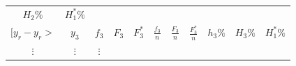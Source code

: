 \documentclass[10pt,]{krantz}
\theoremstyle{definition}
\theoremstyle{definition}
\theoremstyle{definition}
\theoremstyle{definition}
\theoremstyle{remark}
\begin{document}
\begin{longtable}[]{@{}ccccccccccc@{}}
\begin{minipage}[t]{0.05\columnwidth}
\(H_2\%\)\strut
\end{minipage} & \begin{minipage}[t]{0.05\columnwidth}\centering
\(H_1^*\%\)\strut
\end{minipage}\tabularnewline
\begin{minipage}[t]{0.16\columnwidth}\centering
\([y_{r}-y_r>\)\strut
\end{minipage} & \begin{minipage}[t]{0.08\columnwidth}\centering
\(y_3\)\strut
\end{minipage} & \begin{minipage}[t]{0.05\columnwidth}\centering
\(f_3\)\strut
\end{minipage} & \begin{minipage}[t]{0.05\columnwidth}\centering
\(F_3\)\strut
\end{minipage} & \begin{minipage}[t]{0.05\columnwidth}\centering
\(F_3^*\)\strut
\end{minipage} & \begin{minipage}[t]{0.05\columnwidth}\centering
\(\frac{f_3}{n}\)\strut
\end{minipage} & \begin{minipage}[t]{0.05\columnwidth}\centering
\(\frac{F_3}{n}\)\strut
\end{minipage} & \begin{minipage}[t]{0.05\columnwidth}\centering
\(\frac{F_3^*}{n}\)\strut
\end{minipage} & \begin{minipage}[t]{0.05\columnwidth}\centering
\(h_3\%\)\strut
\end{minipage} & \begin{minipage}[t]{0.05\columnwidth}\centering
\(H_3\%\)\strut
\end{minipage} & \begin{minipage}[t]{0.05\columnwidth}\centering
\(H_1^*\%\)\strut
\end{minipage}\tabularnewline
\begin{minipage}[t]{0.16\columnwidth}\centering
\(\vdots\)\strut
\end{minipage} & \begin{minipage}[t]{0.08\columnwidth}\centering
\(\vdots\)\strut
\end{minipage} & \begin{minipage}[t]{0.05\columnwidth}\centering
\(\vdots\)\strut
\end{minipage} & \begin{minipage}[t]{0.05\columnwidth}\centering

\end{minipage}
\end{longtable}
\end{document}
